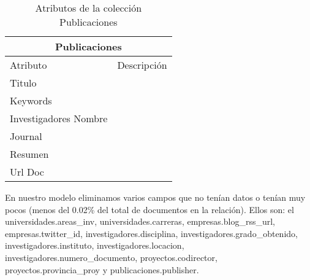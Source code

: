 \begin{center}
\begin{table}[H]
\centering
\begin{tabular}{|  l | l |}
\hline
\multicolumn{2}{|c|}{Publicaciones} \\ \hline
Atributo & Descripción \\ \hline
Titulo & \\ \hline 
Keywords & \\ \hline 
Investigadores Nombre & \\ \hline 
Journal & \\ \hline 
Resumen & \\ \hline 
Url Doc  & \\ \hline 
\end{tabular}
\caption{Atributos de la colección Publicaciones}
\label{table:publicaciones}
\end{table}
\end{center}


En nuestro modelo eliminamos varios campos que no tenían datos o tenían muy pocos (menos del 0.02\% del total de documentos en la relación). Ellos son: el universidades.areas\_inv, universidades.carreras, empresas.blog\_rss\_url, empresas.twitter\_id, investigadores.disciplina, investigadores.grado\_obtenido, investigadores.instituto, investigadores.locacion, investigadores.numero\_documento, proyectos.codirector, proyectos.provincia\_proy y publicaciones.publisher.


